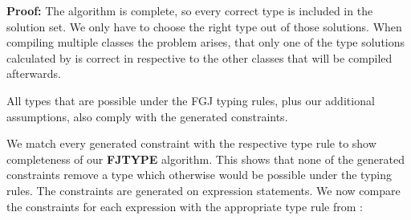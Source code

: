 \documentclass[a4paper,USenglish,cleveref, autoref, thm-restate]{lipics-v2021}
\begin{document}
\begin{theoremAndi}

\end{theoremAndi}
\textbf{Proof:} The \unify algorithm is complete, so every correct type is included in the solution set.
We only have to choose the right type out of those solutions.
When compiling multiple classes the problem arises,
that only one of the type solutions calculated by \unify is correct
in respective to the other classes that will be compiled afterwards.

All types that are possible under the FGJ typing rules, plus our additional assumptions,
also comply with the generated constraints.

We match every generated constraint with the respective type rule to show completeness of our \textbf{FJTYPE} algorithm.
This shows that none of the generated constraints remove a type which otherwise would be possible under the \TFGJ typing rules.
The constraints are generated on expression statements.
We now compare the constraints for each expression with the appropriate type rule from \TFGJ:
\end{document}
